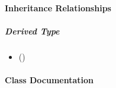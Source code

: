 \documentclass[letterpaper,10pt,english]{sphinxmanual}
\begin{document}
\paragraph{Inheritance Relationships}
\label{\detokenize{api/classUi__MeshDockWidget:inheritance-relationships}}

\subparagraph{Derived Type}
\label{\detokenize{api/classUi__MeshDockWidget:derived-type}}\begin{itemize}
\item {} 
\sphinxAtStartPar
{} ({\hyperref[\detokenize{api/classUi_1_1MeshDockWidget:exhale-class-classui-1-1meshdockwidget}]{}})

\end{itemize}


\paragraph{Class Documentation}
\label{\detokenize{api/classUi__MeshDockWidget:class-documentation}}
\end{document}
